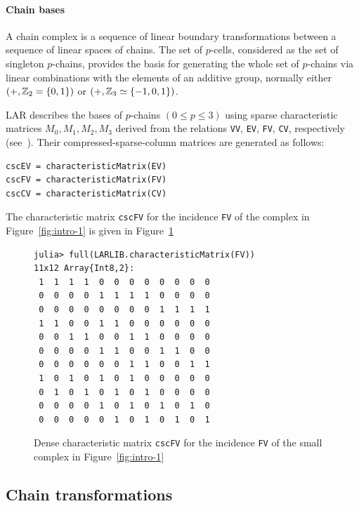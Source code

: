 \paragraph{Chain bases}

A chain complex is a sequence of linear boundary transformations between a sequence of linear spaces of chains. The set of $p$-cells, considered as the set of singleton $p$-chains, provides the basis for generating the whole set of $p$-chains via linear combinations with the elements of an additive group, normally either $(+,\mathbb{Z}_2=\{0,1\})$ or $(+,\mathbb{Z}_3\simeq\{-1,0,1\})$.

LAR describes the bases of $p$-chains $(0\leq p\leq 3)$ using sparse characteristic matrices  $M_0, M_1, M_2, M_3$ derived from the relations \texttt{VV}, \texttt{EV}, \texttt{FV}, \texttt{CV}, respectively  (see~\cite{Dicarlo:2014:TNL:2543138.2543294}).
Their compressed-sparse-column matrices are generated as follows:
{\small\begin{verbatim}
cscEV = characteristicMatrix(EV)
cscFV = characteristicMatrix(FV)
cscCV = characteristicMatrix(CV)
\end{verbatim}}

The characteristic matrix \texttt{cscFV} for the incidence \texttt{FV} of the complex in Figure~\ref{fig:intro-1} is given in Figure~\ref{fig:intro-0}

\begin{figure}[htbp] %
\begin{center}
\begin{minipage}[c]{0.5\textwidth}
\small\begin{verbatim}
julia> full(LARLIB.characteristicMatrix(FV))
11x12 Array{Int8,2}:
 1  1  1  1  0  0  0  0  0  0  0  0
 0  0  0  0  1  1  1  1  0  0  0  0
 0  0  0  0  0  0  0  0  1  1  1  1
 1  1  0  0  1  1  0  0  0  0  0  0
 0  0  1  1  0  0  1  1  0  0  0  0
 0  0  0  0  1  1  0  0  1  1  0  0
 0  0  0  0  0  0  1  1  0  0  1  1
 1  0  1  0  1  0  1  0  0  0  0  0
 0  1  0  1  0  1  0  1  0  0  0  0
 0  0  0  0  1  0  1  0  1  0  1  0
 0  0  0  0  0  1  0  1  0  1  0  1
\end{verbatim}
\end{minipage}
\end{center}
   \caption{Dense characteristic matrix \texttt{cscFV} for the incidence \texttt{FV} of the small complex in Figure~\ref{fig:intro-1}}
   \label{fig:intro-0}
\end{figure}

\subsection{Chain transformations}

